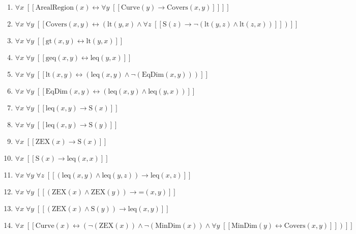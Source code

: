 \documentclass{article}
\begin{document}
\begin{enumerate}
\item $\forall x\;  \left[ \left[ \textrm{ArealRegion}(x) \leftrightarrow \forall y\;  \left[ \left[ \textrm{Curve}(y) \rightarrow \textrm{Covers}(x,y) \right] \right] \right] \right]$
\item $\forall x\; \forall y\;  \left[ \left[ \textrm{Covers}(x,y) \leftrightarrow \left(\textrm{lt}(y,x) \land \forall z\;  \left[ \left[ \textrm{S}(z) \rightarrow \neg \left(\textrm{lt}(y,z) \land \textrm{lt}(z,x)\right) \right] \right]\right) \right] \right]$
\item $\forall x\; \forall y\;  \left[ \left[ \textrm{gt}(x,y) \leftrightarrow \textrm{lt}(y,x) \right] \right]$
\item $\forall x\; \forall y\;  \left[ \left[ \textrm{geq}(x,y) \leftrightarrow \textrm{leq}(y,x) \right] \right]$
\item $\forall x\; \forall y\;  \left[ \left[ \textrm{lt}(x,y) \leftrightarrow \left(\textrm{leq}(x,y) \land \neg \left(\textrm{EqDim}(x,y)\right)\right) \right] \right]$
\item $\forall x\; \forall y\;  \left[ \left[ \textrm{EqDim}(x,y) \leftrightarrow \left(\textrm{leq}(x,y) \land \textrm{leq}(y,x)\right) \right] \right]$
\item $\forall x\; \forall y\;  \left[ \left[ \textrm{leq}(x,y) \rightarrow \textrm{S}(x) \right] \right]$
\item $\forall x\; \forall y\;  \left[ \left[ \textrm{leq}(x,y) \rightarrow \textrm{S}(y) \right] \right]$
\item $\forall x\;  \left[ \left[ \textrm{ZEX}(x) \rightarrow \textrm{S}(x) \right] \right]$
\item $\forall x\;  \left[ \left[ \textrm{S}(x) \rightarrow \textrm{leq}(x,x) \right] \right]$
\item $\forall x\; \forall y\; \forall z\;  \left[ \left[ \left(\textrm{leq}(x,y) \land \textrm{leq}(y,z)\right) \rightarrow \textrm{leq}(x,z) \right] \right]$
\item $\forall x\; \forall y\;  \left[ \left[ \left(\textrm{ZEX}(x) \land \textrm{ZEX}(y)\right) \rightarrow \textrm{=}(x,y) \right] \right]$
\item $\forall x\; \forall y\;  \left[ \left[ \left(\textrm{ZEX}(x) \land \textrm{S}(y)\right) \rightarrow \textrm{leq}(x,y) \right] \right]$
\item $\forall x\;  \left[ \left[ \textrm{Curve}(x) \leftrightarrow \left(\neg \left(\textrm{ZEX}(x)\right) \land \neg \left(\textrm{MinDim}(x)\right) \land \forall y\;  \left[ \left[ \textrm{MinDim}(y) \leftrightarrow \textrm{Covers}(x,y) \right] \right]\right) \right] \right]$

\end{enumerate}
\end{document}
